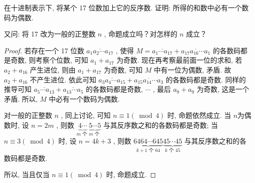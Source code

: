 \begin{example}
	在十进制表示下, 将某个 17 位数加上它的反序数. 证明: 所得的和数中必有一个数码为偶数.

	又问: 将 17 改为一般的正整数 $n$ , 命题成立吗？对怎样的 $n$ 成立？
\end{example}
\begin{proof}
	若存在一个 17 位数 $\overline{a_{1} a_{2} \cdots a_{17}}$ , 使得 $M=\overline{a_{1} \cdots a_{17}}+\overline{a_{17} a_{16} \cdots a_{1}}$ 的各数码都是奇数, 则考察个位数, 可知 $a_{1}+a_{17}$ 为奇数. 现在再考察最前面一位的求和, 若 $a_{2}+a_{16}$ 产生进位, 则由 $a_{1}+a_{17}$ 为奇数, 可知 $M$ 中有一位为偶数, 矛盾. 故 $a_{2}+a_{16}$ 不产生进位. 依此可知 $\overline{a_{3} a_{4} \cdots a_{15}}+\overline{a_{15} a_{14} \cdots a_{3}}$ 的各数码都是奇数. 同样的推导可知 $\overline{a_{5} \cdots a_{13}}+\overline{a_{13} \cdots a_{5}}$ 的各数码都是奇数,  $\cdots$ , 最后 $a_{9}+a_{9}$ 为奇数, 这是一个矛盾. 所以,  $M$ 中必有一个数码为偶数.

	对一般的正整数 $n$ , 同上讨论, 可知 $n \equiv 1(\bmod 4)$ 时, 命题依然成立. 当 $n$为偶数时, 设 $n=2 m$ , 则数 $\underbrace{4 \cdots}_{m \text { 个 }} \underbrace{5 \cdots 5}_{m \text { 个 }}$ 与其反序数之和的各数码都是奇数; 当 $n \equiv 3(\bmod 4)$ 时, 设 $n=4 k+3$ , 则数 $\underbrace{6464 \cdots 645}_{k+1 \text { 个 } 64} \underbrace{45 \cdots 45}_{k \text { 个 } 45}$ 与其反序数之和的各数码都是奇数.

	所以, 当且仅当 $n \equiv 1(\bmod 4)$ 时, 命题成立.
\end{proof}

